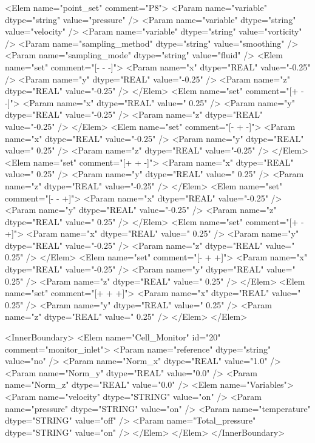 {\begin{program}
   <Elem name="point_set" comment="P8">
     <Param name="variable"   dtype="string"   value="pressure" />
     <Param name="variable"   dtype="string"   value="velocity" />
     <Param name="variable"   dtype="string"   value="vorticity" />
     <Param name="sampling_method" dtype="string" value="smoothing" />
     <Param name="sampling_mode"   dtype="string" value="fluid" />
     <Elem name="set" comment="[- - -]">
       <Param name="x"   dtype="REAL"   value="-0.25" />
       <Param name="y"   dtype="REAL"   value="-0.25" />
       <Param name="z"   dtype="REAL"   value="-0.25" />
     </Elem>
     <Elem name="set" comment="[+ - -]">
       <Param name="x"   dtype="REAL"   value=" 0.25" />
       <Param name="y"   dtype="REAL"   value="-0.25" />
       <Param name="z"   dtype="REAL"   value="-0.25" />
     </Elem>
     <Elem name="set" comment="[- + -]">
       <Param name="x"   dtype="REAL"   value="-0.25" />
       <Param name="y"   dtype="REAL"   value=" 0.25" />
       <Param name="z"   dtype="REAL"   value="-0.25" />
     </Elem>
     <Elem name="set" comment="[+ + -]">
       <Param name="x"   dtype="REAL"   value=" 0.25" />
       <Param name="y"   dtype="REAL"   value=" 0.25" />
       <Param name="z"   dtype="REAL"   value="-0.25" />
     </Elem>
     <Elem name="set" comment="[- - +]">
       <Param name="x"   dtype="REAL"   value="-0.25" />
       <Param name="y"   dtype="REAL"   value="-0.25" />
       <Param name="z"   dtype="REAL"   value=" 0.25" />
     </Elem>
     <Elem name="set" comment="[+ - +]">
       <Param name="x"   dtype="REAL"   value=" 0.25" />
       <Param name="y"   dtype="REAL"   value="-0.25" />
       <Param name="z"   dtype="REAL"   value=" 0.25" />
     </Elem>
     <Elem name="set" comment="[- + +]">
       <Param name="x"   dtype="REAL"   value="-0.25" />
       <Param name="y"   dtype="REAL"   value=" 0.25" />
       <Param name="z"   dtype="REAL"   value=" 0.25" />
     </Elem>
     <Elem name="set" comment="[+ + +]">
       <Param name="x"   dtype="REAL"   value=" 0.25" />
       <Param name="y"   dtype="REAL"   value=" 0.25" />
       <Param name="z"   dtype="REAL"   value=" 0.25" />
     </Elem>
   </Elem>
      
   <InnerBoundary>
     <Elem name="Cell_Monitor" id="20" comment="monitor_inlet"> 
       <Param name="reference" dtype="string" value="no" /> 
       <Param name="Norm_x" dtype="REAL" value="1.0" /> 
       <Param name="Norm_y" dtype="REAL" value="0.0" /> 
       <Param name="Norm_z" dtype="REAL" value="0.0" /> 
       <Elem name="Variables"> 
         <Param name="velocity" dtype="STRING" value="on" /> 
         <Param name="pressure" dtype="STRING" value="on" /> 
         <Param name="temperature" dtype="STRING" value="off" /> 
         <Param name="Total_pressure" dtype="STRING" value="on" /> 
       </Elem> 
     </Elem>
   </InnerBoundary>
\end{program}
}

